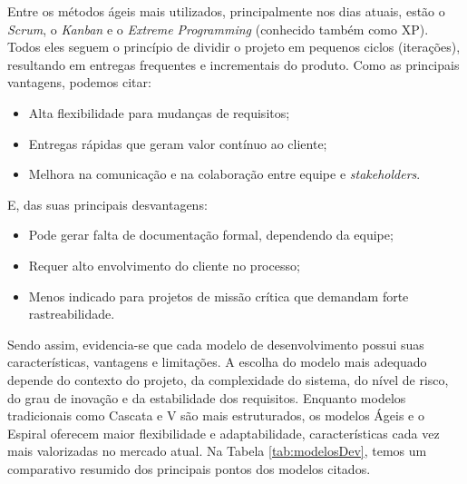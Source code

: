 \documentclass[english,brazilian]{UNISINOSartigo} %
\begin{document}
Entre os métodos ágeis mais utilizados, principalmente nos dias atuais, estão o \textit{Scrum}, o \textit{Kanban} e o \textit{Extreme Programming} (conhecido também como XP). Todos eles seguem o princípio de dividir o projeto em pequenos ciclos (iterações), resultando em entregas frequentes e incrementais do produto. Como as principais vantagens, podemos citar:

\begin{itemize}[leftmargin=1cm, itemsep=0.1em, topsep=0.1em]
    \item Alta flexibilidade para mudanças de requisitos;
    \item Entregas rápidas que geram valor contínuo ao cliente;
    \item Melhora na comunicação e na colaboração entre equipe e \textit{stakeholders}.
\end{itemize}

E, das suas principais desvantagens:

\begin{itemize}[leftmargin=1cm, itemsep=0.1em, topsep=0.1em]
    \item Pode gerar falta de documentação formal, dependendo da equipe;
    \item Requer alto envolvimento do cliente no processo;
    \item Menos indicado para projetos de missão crítica que demandam forte rastreabilidade.
\end{itemize}

Sendo assim, evidencia-se que cada modelo de desenvolvimento possui suas características, vantagens e limitações. A escolha do modelo mais adequado depende do contexto do projeto, da complexidade do sistema, do nível de risco, do grau de inovação e da estabilidade dos requisitos. Enquanto modelos tradicionais como Cascata e V são mais estruturados, os modelos Ágeis e o Espiral oferecem maior flexibilidade e adaptabilidade, características cada vez mais valorizadas no mercado atual. Na Tabela \ref{tab:modelosDev}, temos um comparativo resumido dos principais pontos dos modelos citados.
\end{document}
